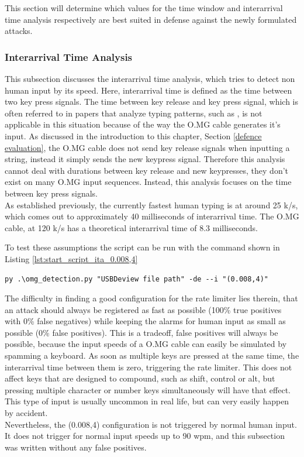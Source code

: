 This section will determine which values for the time window and interarrival time analysis respectively are best suited in defense against the newly formulated attacks.\\


\subsubsection{Interarrival Time Analysis}


This subsection discusses the interarrival time analysis, which tries to detect non human input by its speed. Here, interarrival time is defined as the time between two key press signals. The time between key release and key press signal, which is often referred to in papers that analyze typing patterns, such as \cite{neunerUSBlockBlockingUSBBased2018}, is not applicable in this situation because of the way the O.MG cable generates it's input. As discussed in the introduction to this chapter, Section \ref{defence evaluation}, the O.MG cable does not send key release signals when inputting a string, instead it simply sends the new keypress signal. Therefore this analysis cannot deal with durations between key release and new keypresses, they don't exist on many O.MG input sequences. Instead, this analysis focuses on the time between key press signals. \\
As established previously, the currently fastest human typing is at around 25 k/s, which comes out to approximately 40 milliseconds of interarrival time. The O.MG cable, at 120 k/s has a theoretical interarrival time of 8.3 milliseconds. 

To test these assumptions the script can be run with the command shown in Listing \ref{lst:start_script_ita_0.008,4}


\begin{lstlisting}[caption={start Defense Script with ITA (0.02,3)},label={lst:start_script_ita_0.008,4}, captionpos=b]
 py .\omg_detection.py "USBDeview file path" -de --i "(0.008,4)"
\end{lstlisting}

The difficulty in finding a good configuration for the rate limiter lies therein, that an attack should always be registered as fast as possible (100\% true positives with 0\% false negatives) while keeping the alarms for human input as small as possible (0\% false positives).
This is a tradeoff, false positives will always be possible, because the input speeds of a O.MG cable can easily be simulated by spamming a keyboard. As soon as multiple keys are pressed at the same time, the interarrival time between them is zero, triggering the rate limiter. This does not affect keys that are designed to compound, such as shift, control or alt, but pressing multiple character or number keys simultaneously will have that effect. This type of input is usually uncommon in real life, but can very easily happen by accident. \\
Nevertheless, the (0.008,4) configuration is not triggered by normal human input. It does not trigger for normal input speeds up to 90 wpm, and this subsection was written without any false positives. 

